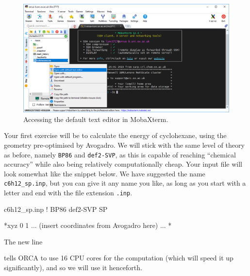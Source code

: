 \documentclass[10pt]{article}
\begin{document}
\begin{figure}[H]
    \centering
    \includegraphics[scale=0.4]{./img/texteditor}
    \caption{Accessing the default text editor in MobaXterm.}
    \label{fig:texteditor}
\end{figure}

Your first exercise will be to calculate the energy of cyclohexane, using the geometry pre-optimised by Avogadro. We will stick with the same level of theory as before, namely \texttt{BP86} and \texttt{def2-SVP}, as this is capable of reaching ``chemical accuracy'' while also being relatively computationally cheap. Your input file will look somewhat like the snippet below. We have suggested the name \texttt{c6h12\_sp.inp}, but you can give it any name you like, as long as you start with a letter and end with the file extension \texttt{.inp}.

\begin{script}{c6h12\_sp.inp}
! BP86 def2-SVP SP


*xyz 0 1
 ... (insert coordinates from Avogadro here) ...
*
\end{script}

The new line

\begin{cmdline}
\end{cmdline}

tells ORCA to use 16 CPU cores for the computation (which will speed it up significantly), and so we will use it henceforth.
\end{document}
